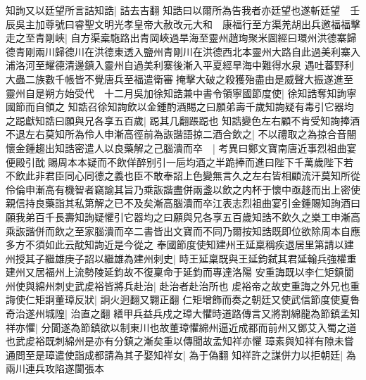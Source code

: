 知詢又以廷望所言詰知誥|{
	詰去吉翻}
知誥曰以爾所為告我者亦廷望也遂斬廷望　壬辰吳主加尊號曰睿聖文明光孝皇帝大赦改元大和　康福行至方渠羌胡出兵邀福福擊走之至青剛峽|{
	自方渠槖駞路出青岡峽過旱海至靈州趙珣聚米圖經曰環州洪德寨歸德青剛兩川歸德川在洪德東透入鹽州青剛川在洪德西北本靈州大路自此過美利寨入浦洛河至耀德清邊鎮入靈州自過美利寨後漸入平夏經旱海中難得水泉}
遇吐蕃野利大蟲二族數千帳皆不覺唐兵至福遣衛審掩擊大破之殺獲殆盡由是威聲大振遂進至靈州自是朔方始受代　十二月吳加徐知誥兼中書令領寧國節度使|{
	徐知誥奪知詢寧國節而自領之}
知誥召徐知詢飲以金鍾酌酒賜之曰願弟壽千歲知詢疑有毒引它器均之跽獻知誥曰願與兄各享五百歲|{
	跽其几翻䠆跽也}
知誥變色左右顧不肯受知詢捧酒不退左右莫知所為伶人申漸高徑前為詼諧語掠二酒合飲之|{
	不以禮取之為掠合音閤}
懷金鍾趨出知誥密遣人以良藥解之己腦潰而卒　|{
	考異曰鄭文寶南唐近事烈祖曲宴便殿引酖賜周本本疑而不飲佯醉别引一巵均酒之半跪捧而進曰陛下千萬歲陛下若不飲此非君臣同心同德之義也臣不敢奉詔上色變無言久之左右皆相顧流汗莫知所從伶倫申漸高有機智者竊諭其旨乃乘詼諧盡併兩盞以飲之内杯于懷中亟趍而出上密使親信持良藥詣其私第解之已不及矣漸高腦潰而卒江表志烈祖曲宴引金鍾賜知詢酒曰願我弟百千長壽知詢疑懼引它器均之曰願與兄各享五百歲知誥不飲久之樂工申漸高乘詼諧併而飲之至家腦潰而卒二書皆出文寶而不同乃爾按知誥既即位欲除周本自應多方不須如此云酖知詢近是今從之}
奉國節度使知建州王延稟稱疾退居里第請以建州授其子繼雄庚子詔以繼雄為建州刺史|{
	時王延稟既與王延鈞弑其君延翰兵強權重建州又居福州上流勢陵延鈞故不復稟命于延鈞而專達洛陽}
安重誨既以李仁矩鎮閬州使與綿州刺史武䖍裕皆將兵赴治|{
	赴治者赴治所也}
䖍裕帝之故吏重誨之外兄也重誨使仁矩詗董璋反狀|{
	詗火迥翻又翾正翻}
仁矩增飾而奏之朝廷又使武信節度使夏魯奇治遂州城隍|{
	治直之翻}
繕甲兵益兵戍之璋大懼時道路傳言又將割綿龍為節鎮孟知祥亦懼|{
	分閬遂為節鎮欲以制東川也故董璋懼綿州逼近成都而前州又鄧艾入蜀之道也武䖍裕既刺綿州是亦有分鎮之漸矣重以傳聞故孟知祥亦懼}
璋素與知祥有隙未嘗通問至是璋遣使詣成都請為其子娶知祥女|{
	為于偽翻}
知祥許之謀併力以拒朝廷|{
	為兩川連兵攻陷遂閬張本}


